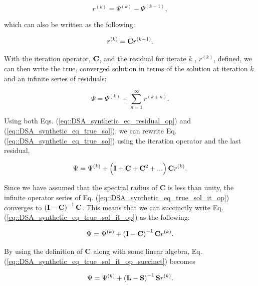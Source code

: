 \begin{equation}
\label{eq::DSA_synthetic_eq_residual}
r^{(k)} = \Psi^{(k)} - \Psi^{(k-1)} ,
\end{equation}

\noindent which can also be written as the following:

\begin{equation}
\label{eq::DSA_synthetic_eq_residual_op}
r^{(k)} = {\bf C}r^{(k-1)} .
\end{equation}

With the iteration operator, ${\bf C}$, and the residual for iterate $k$ , $r^{(k)}$, defined, we can then write the true, converged solution in terms of the solution at iteration $k$ and an infinite series of residuals:

\begin{equation}
\label{eq::DSA_synthetic_eq_true_sol}
\Psi = \Psi^{(k)} + \sum_{n=1}^{\infty} r^{(k+n)} .
\end{equation}

\noindent Using both Eqs. (\ref{eq::DSA_synthetic_eq_residual_op}) and (\ref{eq::DSA_synthetic_eq_true_sol}), we can rewrite Eq. (\ref{eq::DSA_synthetic_eq_true_sol}) using the iteration operator and the last residual,

\begin{equation}
\label{eq::DSA_synthetic_eq_true_sol_it_op}
\Psi = \Psi^{(k)} + \left(  {\bf I} + {\bf C} + {\bf C}^2 + ...  \right) {\bf C} r^{(k)}.
\end{equation}

\noindent Since we have assumed that the spectral radius of {\bf C} is less than unity, the infinite operator series of Eq. (\ref{eq::DSA_synthetic_eq_true_sol_it_op}) converges to $\left(  {\bf I} - {\bf C}   \right)^{-1} {\bf C}$. This means that we can succinctly write Eq. (\ref{eq::DSA_synthetic_eq_true_sol_it_op}) as the following:

\begin{equation}
\label{eq::DSA_synthetic_eq_true_sol_it_op_succinct}
\Psi = \Psi^{(k)} + \left(  {\bf I} - {\bf C}   \right)^{-1} {\bf C} r^{(k)}.
\end{equation}

\noindent By using the definition of ${\bf C}$ along with some linear algebra, Eq. (\ref{eq::DSA_synthetic_eq_true_sol_it_op_succinct}) becomes 

\begin{equation}
\label{eq::DSA_synthetic_eq_true_sol_orig_ops}
\Psi = \Psi^{(k)} + \left(  {\bf L} - {\bf S}   \right)^{-1} {\bf S} r^{(k)}.
\end{equation}

